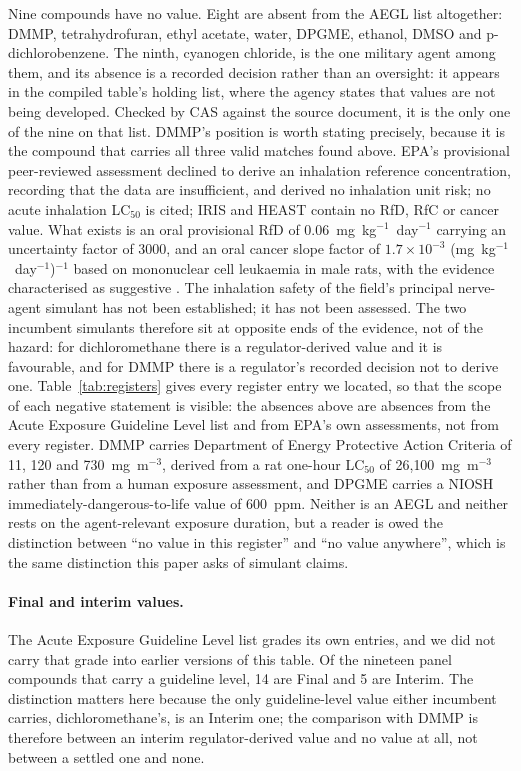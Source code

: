 \documentclass[11pt,a4paper]{article}
\begin{document}
Nine compounds have no value. Eight are absent from the AEGL list altogether:
DMMP, tetrahydrofuran, ethyl acetate, water, DPGME, ethanol, DMSO and
p-dichlorobenzene. The ninth, cyanogen chloride, is the one military agent
among them, and its absence is a recorded decision rather than an oversight: it
appears in the compiled table's holding list, where the agency states that
values are not being developed. Checked by CAS against the source document, it
is the only one of the nine on that list. DMMP's position is worth stating
precisely, because it is the compound
that carries all three valid matches found above. EPA's provisional
peer-reviewed assessment declined to derive an inhalation reference
concentration, recording that the data are insufficient, and derived no
inhalation unit risk; no acute inhalation LC$_{50}$ is cited; IRIS and HEAST
contain no RfD, RfC or cancer value. What exists is an oral provisional RfD of
0.06~mg~kg$^{-1}$~day$^{-1}$ carrying an uncertainty factor of 3000, and an oral
cancer slope factor of $1.7\times10^{-3}$ (mg~kg$^{-1}$~day$^{-1}$)$^{-1}$ based
on mononuclear cell leukaemia in male rats, with the evidence characterised as
suggestive \cite{epapprtv2006}. The inhalation safety of the field's principal
nerve-agent simulant has not been established; it has not been assessed. The two
incumbent simulants therefore sit at opposite ends of the evidence, not of the
hazard: for dichloromethane there is a regulator-derived value and it is
favourable, and for DMMP there is a regulator's recorded decision not to derive
one. Table~\ref{tab:registers} gives every register entry we located, so that
the scope of each negative statement is visible: the absences above are
absences from the Acute Exposure Guideline Level list and from EPA's own
assessments, not from every register. DMMP carries Department of Energy
Protective Action Criteria of 11, 120 and 730~mg~m$^{-3}$, derived from a rat
one-hour LC$_{50}$ of 26{,}100~mg~m$^{-3}$ rather than from a human exposure
assessment, and DPGME carries a NIOSH immediately-dangerous-to-life value of
600~ppm. Neither is an AEGL and neither rests on the agent-relevant exposure
duration, but a reader is owed the distinction between
``no value in this register'' and ``no value anywhere'', which is the same
distinction this paper asks of simulant claims.



\paragraph{Final and interim values.} The Acute Exposure Guideline Level list
grades its own entries, and we did not carry that grade into earlier versions of
this table. Of the nineteen panel compounds that carry a guideline level, 14 are
Final and 5 are Interim. The distinction matters here because the only
guideline-level value either incumbent carries, dichloromethane's, is an Interim
one; the comparison with DMMP is therefore between an interim regulator-derived
value and no value at all, not between a settled one and none.
\end{document}
